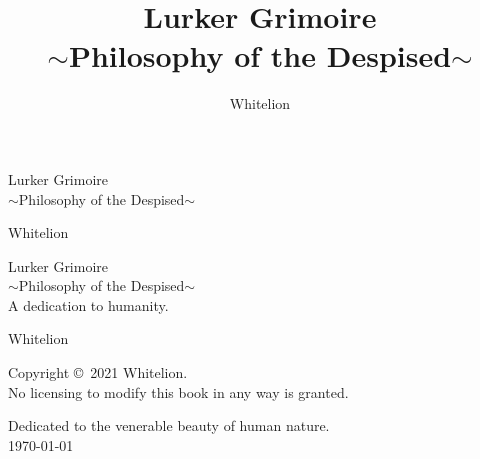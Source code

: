 \documentclass{book}
\title{Lurker Grimoire\\$\sim$Philosophy of the Despised$\sim$}
\author{Whitelion}
\begin{document}
\frontmatter
{}

\thispagestyle{empty}

\begin{flushleft}

\vspace*{.24\paperheight}

{\LARGE Lurker Grimoire\\$\sim$Philosophy of the Despised$\sim$}

\vspace*{.08\paperheight}
\hfill {\LARGE Whitelion}

\end{flushleft}

\restoregeometry

\thispagestyle{empty}
\mbox{}\newpage

\thispagestyle{empty}
\setcounter{page}{1}
\pagebreak

\begin{flushright}

\vspace*{.18\paperheight}

{\Huge Lurker Grimoire}\\
{\Large $\sim$Philosophy of the Despised$\sim$}\\

\vspace*{.08\paperheight}
A dedication to humanity.

\vspace*{.08\textheight} 

{\Large
Whitelion\\
}

\vfill

\end{flushright}

\pagebreak

\pagebreak
\thispagestyle{empty}

\noindent
Copyright \copyright ~2021 Whitelion.\\
No licensing to modify this book in any way is granted.

\vfill
\begin{center}
Dedicated to the venerable beauty of human nature.\\
\today
\end{center}
\end{document}
